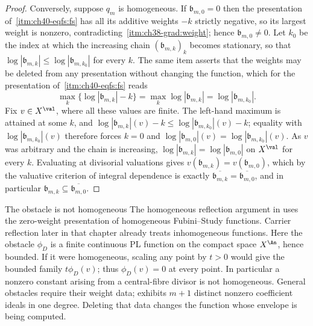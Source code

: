 \begin{proof}
Conversely, suppose $q_m$ is homogeneous.  If $\mathfrak b_{m,0}=0$ then
the presentation of
\,\cref{itm:ch40-eqfs:fs} has all its
additive weights $-k$ strictly negative, so its largest weight is nonzero,
contradicting
\,\cref{itm:ch38-grad:weight}; hence
$\mathfrak b_{m,0}\ne0$.  Let $k_0$ be the index at which the increasing
chain $(\mathfrak b_{m,k})_k$ becomes stationary, so that
$\log|\mathfrak b_{m,k}|\le\log|\mathfrak b_{m,k_0}|$ for every $k$.
The same item asserts that the weights may be deleted from any presentation
without changing the function, which for the presentation of
\,\cref{itm:ch40-eqfs:fs} reads
\[
 \max_k\bigl\{\log|\mathfrak b_{m,k}|-k\bigr\}
 =\max_k\log|\mathfrak b_{m,k}|
 =\log|\mathfrak b_{m,k_0}| .
\]
Fix $v\in X^{\val}$, where all these values are finite.  The left-hand
maximum is attained at some $k$, and
$\log|\mathfrak b_{m,k}|(v)-k\le\log|\mathfrak b_{m,k_0}|(v)-k$; equality
with $\log|\mathfrak b_{m,k_0}|(v)$ therefore forces $k=0$ and
$\log|\mathfrak b_{m,0}|(v)=\log|\mathfrak b_{m,k_0}|(v)$.  As $v$ was
arbitrary and the chain is increasing, $\log|\mathfrak b_{m,k}|
=\log|\mathfrak b_{m,0}|$ on $X^{\val}$ for every $k$.  Evaluating at
divisorial valuations gives $v(\mathfrak b_{m,k})=v(\mathfrak b_{m,0})$,
which by the valuative criterion of integral dependence
 is exactly
$\overline{\mathfrak b_{m,k}}=\overline{\mathfrak b_{m,0}}$, and in
particular $\mathfrak b_{m,k}\subseteq\overline{\mathfrak b_{m,0}}$.
\end{proof}

\begin{warning}{The obstacle is not homogeneous}
\label{warn:ch40-two-gradings}
The homogeneous reflection argument in
 uses the zero-weight presentation
of homogeneous Fubini--Study functions.  Carrier reflection later in that
chapter already treats inhomogeneous functions.  Here the obstacle
$\phi_D$ is a finite continuous PL function on the compact space $X^{\An}$,
hence bounded.  If it were homogeneous, scaling any point by $t>0$
would give the bounded family $t\phi_D(v)$; thus $\phi_D(v)=0$ at every
point.  In particular a nonzero constant arising from a central-fibre
divisor is not homogeneous.  General obstacles require their weight data;
 exhibits $m+1$ distinct nonzero coefficient
ideals in one degree.  Deleting that data changes the function whose
envelope is being computed.
\end{warning}

